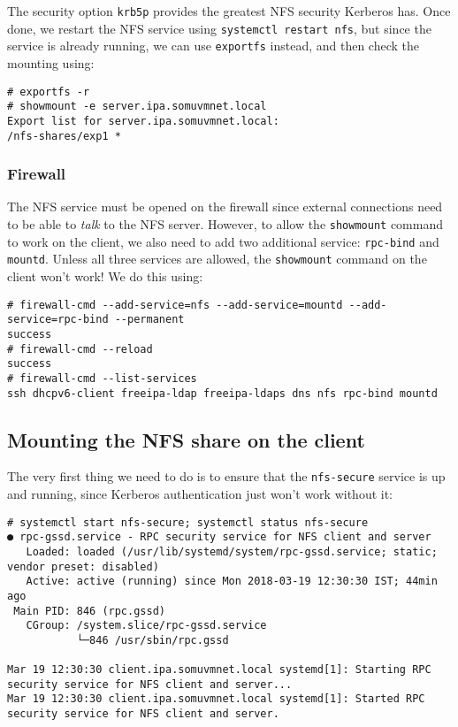 \noindent
The security option \verb|krb5p| provides the greatest NFS security Kerberos has. Once done, we restart the NFS service using \verb|systemctl restart nfs|, but since the service is already running, we can use \verb|exportfs| instead, and then check the mounting using: 

\vspace{-15pt}
\begin{verbatim}
# exportfs -r
# showmount -e server.ipa.somuvmnet.local
Export list for server.ipa.somuvmnet.local:
/nfs-shares/exp1 *
\end{verbatim}
\vspace{-10pt}	

\subsubsection{Firewall}
\vspace{-10pt}
The NFS service must be opened on the firewall since external connections need to be able to \textit{talk} to the NFS server. However, to allow the \verb|showmount| command to work on the client, we also need to add two additional service: \verb|rpc-bind| and \verb|mountd|. Unless all three services are allowed, the \verb|showmount| command on the client won't work! We do this using:

\vspace{-15pt}
\begin{verbatim}
# firewall-cmd --add-service=nfs --add-service=mountd --add-service=rpc-bind --permanent 
success
# firewall-cmd --reload
success
# firewall-cmd --list-services 
ssh dhcpv6-client freeipa-ldap freeipa-ldaps dns nfs rpc-bind mountd
\end{verbatim}
\vspace{-10pt}	

\subsection{Mounting the NFS share on the client}
The very first thing we need to do is to ensure that the \verb|nfs-secure| service is up and running, since Kerberos authentication just won't work without it:

\vspace{-15pt}
\begin{verbatim}
# systemctl start nfs-secure; systemctl status nfs-secure
● rpc-gssd.service - RPC security service for NFS client and server
   Loaded: loaded (/usr/lib/systemd/system/rpc-gssd.service; static; vendor preset: disabled)
   Active: active (running) since Mon 2018-03-19 12:30:30 IST; 44min ago
 Main PID: 846 (rpc.gssd)
   CGroup: /system.slice/rpc-gssd.service
           └─846 /usr/sbin/rpc.gssd

Mar 19 12:30:30 client.ipa.somuvmnet.local systemd[1]: Starting RPC security service for NFS client and server...
Mar 19 12:30:30 client.ipa.somuvmnet.local systemd[1]: Started RPC security service for NFS client and server.
\end{verbatim}
\vspace{-10pt}	

